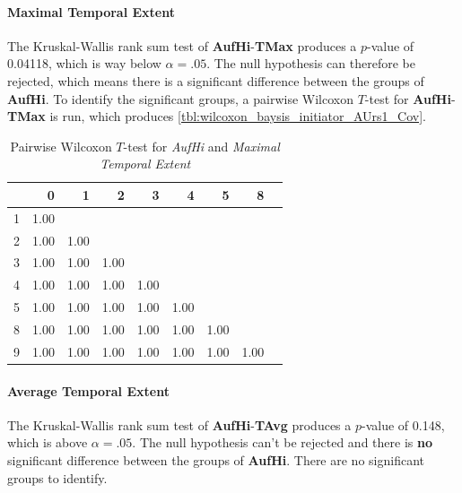 \paragraph{Maximal Temporal Extent}
The Kruskal-Wallis rank sum test of \textbf{AufHi}-\textbf{TMax} produces a $p$-value of 0.04118, which is way below $\alpha=.05$. The null hypothesis can therefore be rejected, which means there is a significant difference between the groups of \textbf{AufHi}. To identify the significant groups, a pairwise Wilcoxon $T$-test for \textbf{AufHi}-\textbf{TMax} is run, which produces \cref{tbl:wilcoxon_baysis_initiator_AUrs1_Cov}. 
\begin{table}[ht]
	\small
	\centering
    \begin{tabular}{rrrrrrrrr}
        \hline
        & 0 & 1 & 2 & 3 & 4 & 5 & 8 \\ 
        \hline
        1 & 1.00 &  &  &  &  &  &  \\ 
        2 & 1.00 & 1.00 &  &  &  &  &  \\ 
        3 & 1.00 & 1.00 & 1.00 &  &  &  &  \\ 
        4 & 1.00 & 1.00 & 1.00 & 1.00 &  &  &  \\ 
        5 & 1.00 & 1.00 & 1.00 & 1.00 & 1.00 &  &  \\ 
        8 & 1.00 & 1.00 & 1.00 & 1.00 & 1.00 & 1.00 &  \\ 
        9 & 1.00 & 1.00 & 1.00 & 1.00 & 1.00 & 1.00 & 1.00 \\ 
        \hline
    \end{tabular}
    \caption{Pairwise Wilcoxon $T$-test for \textit{AufHi} and \textit{Maximal Temporal Extent}}
    \label{tbl:wilcoxon_baysis_initiator_AufHi_TMax}
\end{table}

\paragraph{Average Temporal Extent}
The Kruskal-Wallis rank sum test of \textbf{AufHi}-\textbf{TAvg} produces a $p$-value of 0.148, which is above $\alpha=.05$. The null hypothesis can't be rejected and there is \textbf{no} significant difference between the groups of \textbf{AufHi}. There are no significant groups to identify.

